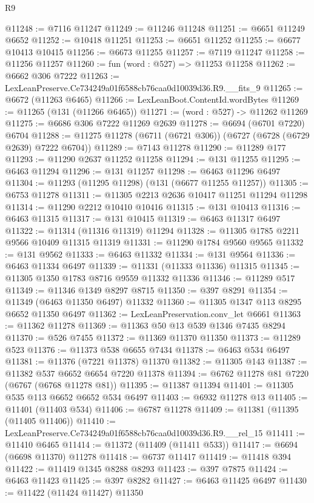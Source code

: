\begin{lexlean}{R9}
\begin{coremodule}
@11248 := @7116 @11247
@11249 := @11246 @11248
@11251 := @6651 @11249 @6652
@11252 := @10418 @11251
@11253 := @6651 @11252
@11255 := @6677 @10413 @10415
@11256 := @6673 @11255
@11257 := @7119 @11247
@11258 := @11256 @11257
@11260 := fun (word : @527) => @11253 @11258
@11262 := @6662 @306 @7222
@11263 := LexLeanPreserve.Ce734249a01f6588cb76caa0d10039d36.R9.__fits_9
@11265 := @6672 (@11263 @6465)
@11266 := LexLeanBoot.ContentId.wordBytes
@11269 := @11265 (@131 (@11266 @6465))
@11271 := (word : @527) -> @11262 @11269
@11275 := @6686 @306 @7222 @11269 @2639
@11278 := @6694 (@6701 @7220) @6704
@11288 := @11275 @11278 (@6711 (@6721 @306)) (@6727 (@6728 (@6729 @2639) @7222 @6704))
@11289 := @7143 @11278
@11290 := @11289 @177
@11293 := @11290 @2637 @11252 @11258
@11294 := @131 @11255
@11295 := @6463 @11294
@11296 := @131 @11257
@11298 := @6463 @11296 @6497
@11304 := @11293 (@11295 @11298) (@131 (@6677 @11255 @11257))
@11305 := @6753 @11278
@11311 := @11305 @2213 @2636 @10417 @11251 @11294 @11298
@11314 := @11290 @2212 @10410 @10416
@11315 := @131 @10413
@11316 := @6463 @11315
@11317 := @131 @10415
@11319 := @6463 @11317 @6497
@11322 := @11314 (@11316 @11319) @11294
@11328 := @11305 @1785 @2211 @9566 @10409 @11315 @11319
@11331 := @11290 @1784 @9560 @9565
@11332 := @131 @9562
@11333 := @6463 @11332
@11334 := @131 @9564
@11336 := @6463 @11334 @6497
@11339 := @11331 (@11333 @11336) @11315
@11345 := @11305 @1350 @1783 @8716 @9559 @11332 @11336
@11346 := @11289 @517
@11349 := @11346 @1349 @8297 @8715
@11350 := @397 @8291
@11354 := @11349 (@6463 @11350 @6497) @11332
@11360 := @11305 @1347 @113 @8295 @6652 @11350 @6497
@11362 := LexLeanPreservation.conv_let @6661
@11363 := @11362 @11278
@11369 := @11363 @50 @13 @539 @1346 @7435 @8294
@11370 := @526 @7455
@11372 := @11369 @11370 @11350
@11373 := @11289 @523
@11376 := @11373 @538 @6655 @7434
@11378 := @6463 @534 @6497
@11381 := @11376 (@7221 @11378) @11370
@11382 := @11305 @143
@11387 := @11382 @537 @6652 @6654 @7220 @11378
@11394 := @6762 @11278 @81 @7220 (@6767 (@6768 @11278 @81))
@11395 := @11387 @11394
@11401 := @11305 @535 @113 @6652 @6652 @534 @6497
@11403 := @6932 @11278 @13
@11405 := @11401 (@11403 @534)
@11406 := @6787 @11278
@11409 := @11381 (@11395 (@11405 @11406))
@11410 := LexLeanPreserve.Ce734249a01f6588cb76caa0d10039d36.R9.__rel_15
@11411 := @11410 @6465
@11414 := @11372 (@11409 (@11411 @533))
@11417 := @6694 (@6698 @11370) @11278
@11418 := @6737 @11417
@11419 := @11418 @394
@11422 := @11419 @1345 @8288 @8293
@11423 := @397 @7875
@11424 := @6463 @11423
@11425 := @397 @8282
@11427 := @6463 @11425 @6497
@11430 := @11422 (@11424 @11427) @11350

\end{coremodule}
\end{lexlean}
